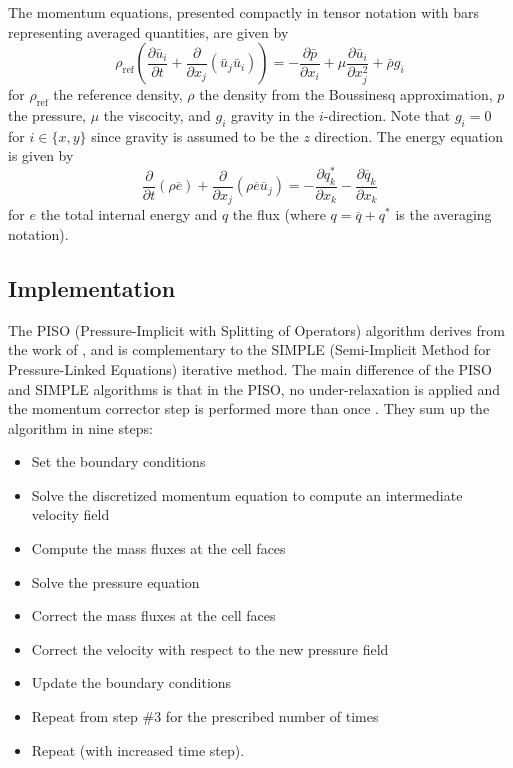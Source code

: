 The momentum equations, presented compactly in tensor notation with bars representing averaged quantities, are given by
\begin{equation} \rho_\text{ref} \left ( \frac{\partial \bar{u}_i}{\partial t} + \frac{\partial}{\partial x_j} \left( \bar{u}_j \bar{u}_i \right) \right )
= -\frac{\partial \bar{p}} {\partial{x_i}} +  \mu \frac{\partial \bar{u}_i}{\partial x_j^2} + \bar{\rho} g_i \end{equation}
for $\rho_\text{ref}$ the reference density, $\rho$ the density from the Boussinesq approximation, $p$ the pressure, $\mu$ the viscocity, and $g_i$ gravity in the $i$-direction.
Note that $g_i = 0$ for $i \in \{ x,y\}$ since gravity is assumed to be the $z$ direction.
The energy equation is given by
\begin{equation} \frac{\partial }{\partial t} \left ( \rho \overline{e}\right ) + \frac{\partial}{\partial x_j} \left ( \rho \overline{e} \overline{u}_j \right ) 
= 
- \frac{\partial q_k^*}{\partial x_k}
- \frac{\partial \overline{q}_k}{\partial x_k}
\end{equation}
for $e$ the total internal energy and $q$ the flux (where $q = \overline{q} + q^*$ is the averaging notation).

\subsection{Implementation}

The PISO (Pressure-Implicit with Splitting of Operators) algorithm derives from the work of \cite{issa1986solution}, and is complementary to the SIMPLE (Semi-Implicit Method for Pressure-Linked Equations) \cite{patankar1972calculation} iterative method.
The main difference of the PISO and SIMPLE algorithms is that in the PISO, no under-relaxation is applied and the momentum corrector step is performed more than once \cite{ferziger1996computational}.
They sum up the algorithm in nine steps:
\begin{itemize}
\item Set the boundary conditions
\item Solve the discretized momentum equation to compute an intermediate velocity field
\item Compute the mass fluxes at the cell faces
\item Solve the pressure equation
\item Correct the mass fluxes at the cell faces
\item Correct the velocity with respect to the new pressure field
\item Update the boundary conditions
\item Repeat from step \#3 for the prescribed number of times
\item Repeat (with increased time step).
\end{itemize}


